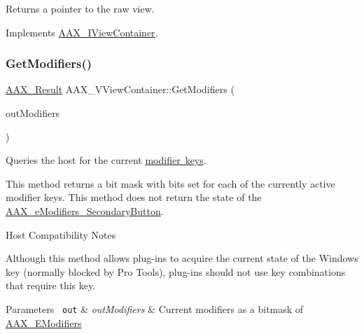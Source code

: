 Returns a pointer to the raw view. 



Implements \mbox{\hyperlink{a01889_adfde8f90c9a29b83dc80042cf9c3f749}{A\+A\+X\+\_\+\+I\+View\+Container}}.

\mbox{\label{a01945_acdc71a4c6bd536bbd3be11635c1ff514}} 
\subsubsection{\texorpdfstring{GetModifiers()}{GetModifiers()}}
{\footnotesize\ttfamily \mbox{\hyperlink{a00392_a4d8f69a697df7f70c3a8e9b8ee130d2f}{A\+A\+X\+\_\+\+Result}} A\+A\+X\+\_\+\+V\+View\+Container\+::\+Get\+Modifiers (\begin{DoxyParamCaption}\item[{uint32\+\_\+t $\ast$}]{out\+Modifiers }\end{DoxyParamCaption})\hspace{0.3cm}{\ttfamily [virtual]}}



Queries the host for the current \mbox{\hyperlink{a00491_a47756e0a56d00468b7045eb26500cb78}{modifier keys}}. 

This method returns a bit mask with bits set for each of the currently active modifier keys. This method does not return the state of the \mbox{\hyperlink{a00491_a47756e0a56d00468b7045eb26500cb78a6d7914ad68992fa2670fc0327704cbb7}{A\+A\+X\+\_\+e\+Modifiers\+\_\+\+Secondary\+Button}}.

\begin{DoxyRefDesc}{Host Compatibility Notes}
\item[\mbox{\hyperlink{a00786__compatibility_notes000064}{Host Compatibility Notes}}]Although this method allows plug-\/ins to acquire the current state of the Windows key (normally blocked by Pro Tools), plug-\/ins should not use key combinations that require this key.\end{DoxyRefDesc}



\begin{DoxyParams}[1]{Parameters}
\mbox{\texttt{ out}}  & {\em out\+Modifiers} & Current modifiers as a bitmask of \mbox{\hyperlink{a00491_a47756e0a56d00468b7045eb26500cb78}{A\+A\+X\+\_\+\+E\+Modifiers}} \\
\hline
\end{DoxyParams}


